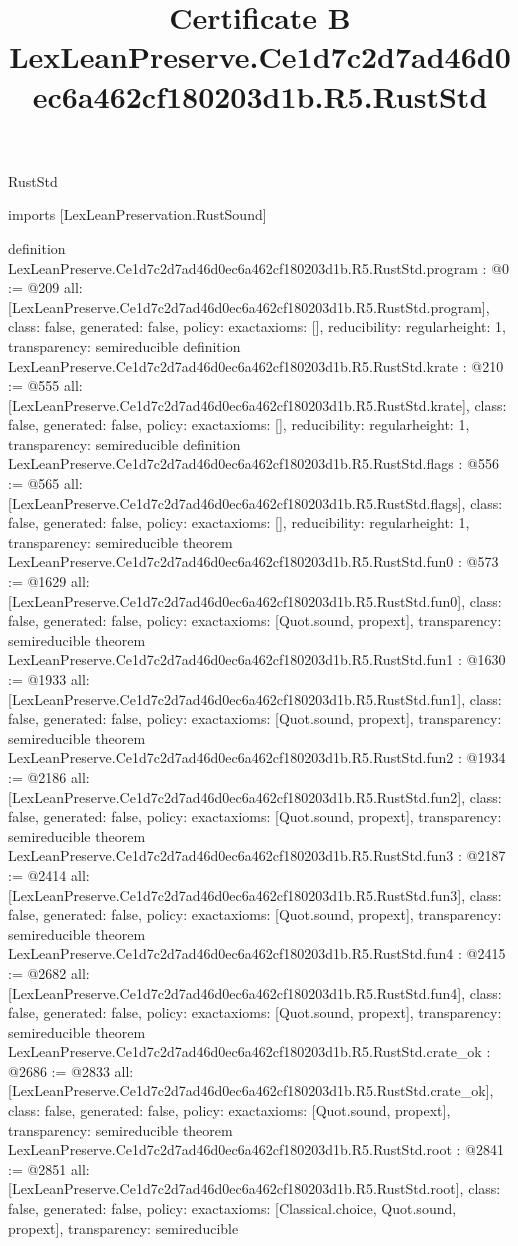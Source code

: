 \begin{lexlean}{RustStd}
\title{Certificate B LexLeanPreserve.Ce1d7c2d7ad46d0ec6a462cf180203d1b.R5.RustStd}
\begin{coremodule}
imports [LexLeanPreservation.RustSound]

definition LexLeanPreserve.Ce1d7c2d7ad46d0ec6a462cf180203d1b.R5.RustStd.program : @0 := @209 {
  all: [LexLeanPreserve.Ce1d7c2d7ad46d0ec6a462cf180203d1b.R5.RustStd.program],
  class: false,
  generated: false,
  policy: exact{axioms: []},
  reducibility: regular{height: 1},
  transparency: semireducible
}
definition LexLeanPreserve.Ce1d7c2d7ad46d0ec6a462cf180203d1b.R5.RustStd.krate : @210 := @555 {
  all: [LexLeanPreserve.Ce1d7c2d7ad46d0ec6a462cf180203d1b.R5.RustStd.krate],
  class: false,
  generated: false,
  policy: exact{axioms: []},
  reducibility: regular{height: 1},
  transparency: semireducible
}
definition LexLeanPreserve.Ce1d7c2d7ad46d0ec6a462cf180203d1b.R5.RustStd.flags : @556 := @565 {
  all: [LexLeanPreserve.Ce1d7c2d7ad46d0ec6a462cf180203d1b.R5.RustStd.flags],
  class: false,
  generated: false,
  policy: exact{axioms: []},
  reducibility: regular{height: 1},
  transparency: semireducible
}
theorem LexLeanPreserve.Ce1d7c2d7ad46d0ec6a462cf180203d1b.R5.RustStd.fun0 : @573 := @1629 {
  all: [LexLeanPreserve.Ce1d7c2d7ad46d0ec6a462cf180203d1b.R5.RustStd.fun0],
  class: false,
  generated: false,
  policy: exact{axioms: [Quot.sound, propext]},
  transparency: semireducible
}
theorem LexLeanPreserve.Ce1d7c2d7ad46d0ec6a462cf180203d1b.R5.RustStd.fun1 : @1630 := @1933 {
  all: [LexLeanPreserve.Ce1d7c2d7ad46d0ec6a462cf180203d1b.R5.RustStd.fun1],
  class: false,
  generated: false,
  policy: exact{axioms: [Quot.sound, propext]},
  transparency: semireducible
}
theorem LexLeanPreserve.Ce1d7c2d7ad46d0ec6a462cf180203d1b.R5.RustStd.fun2 : @1934 := @2186 {
  all: [LexLeanPreserve.Ce1d7c2d7ad46d0ec6a462cf180203d1b.R5.RustStd.fun2],
  class: false,
  generated: false,
  policy: exact{axioms: [Quot.sound, propext]},
  transparency: semireducible
}
theorem LexLeanPreserve.Ce1d7c2d7ad46d0ec6a462cf180203d1b.R5.RustStd.fun3 : @2187 := @2414 {
  all: [LexLeanPreserve.Ce1d7c2d7ad46d0ec6a462cf180203d1b.R5.RustStd.fun3],
  class: false,
  generated: false,
  policy: exact{axioms: [Quot.sound, propext]},
  transparency: semireducible
}
theorem LexLeanPreserve.Ce1d7c2d7ad46d0ec6a462cf180203d1b.R5.RustStd.fun4 : @2415 := @2682 {
  all: [LexLeanPreserve.Ce1d7c2d7ad46d0ec6a462cf180203d1b.R5.RustStd.fun4],
  class: false,
  generated: false,
  policy: exact{axioms: [Quot.sound, propext]},
  transparency: semireducible
}
theorem LexLeanPreserve.Ce1d7c2d7ad46d0ec6a462cf180203d1b.R5.RustStd.crate_ok : @2686 := @2833 {
  all: [LexLeanPreserve.Ce1d7c2d7ad46d0ec6a462cf180203d1b.R5.RustStd.crate_ok],
  class: false,
  generated: false,
  policy: exact{axioms: [Quot.sound, propext]},
  transparency: semireducible
}
theorem LexLeanPreserve.Ce1d7c2d7ad46d0ec6a462cf180203d1b.R5.RustStd.root : @2841 := @2851 {
  all: [LexLeanPreserve.Ce1d7c2d7ad46d0ec6a462cf180203d1b.R5.RustStd.root],
  class: false,
  generated: false,
  policy: exact{axioms: [Classical.choice, Quot.sound, propext]},
  transparency: semireducible
}


\end{coremodule}
\end{lexlean}
